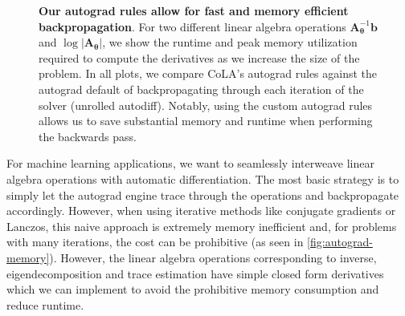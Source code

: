 \documentclass{article}
\newcommand{\mbf}[1]{{\boldsymbol{\mathbf{#1}}}}
\renewcommand{\bm}{\mbf}
\begin{document}
\begin{figure}
\begin{tabular}{cc}
    \\
    \end{tabular}
    \caption{
      \textbf{Our autograd rules allow for fast and memory efficient backpropagation}.
      For two different linear algebra operations $\bm{A}_{\bm{\theta}}^{-1} \bm{b}$ and $\log |\bm{A}_{\bm{\theta}}|$,
      we show the runtime and peak memory utilization required to compute the derivatives as we increase the size of the problem.
      In all plots, we compare CoLA's autograd rules against the autograd default of
      backpropagating through each iteration of the solver (unrolled autodiff).
      Notably, using the custom autograd rules allows us to save substantial memory and runtime when performing the backwards pass.
    }
    \vspace{-0.5em}
    \label{fig:autograd-memory}
\end{figure}

For machine learning applications, we want to seamlessly interweave linear algebra operations with automatic differentiation.
The most basic strategy is to simply let the autograd engine trace through the operations and backpropagate accordingly.
However, when using iterative methods like conjugate gradients or Lanczos, this naive approach is extremely memory inefficient and, for problems with many iterations,
the cost can be prohibitive (as seen in \autoref{fig:autograd-memory}).
However, the linear algebra operations corresponding to inverse, eigendecomposition and trace estimation have simple closed form derivatives which we can implement to avoid the prohibitive memory consumption and reduce runtime.
\end{document}
